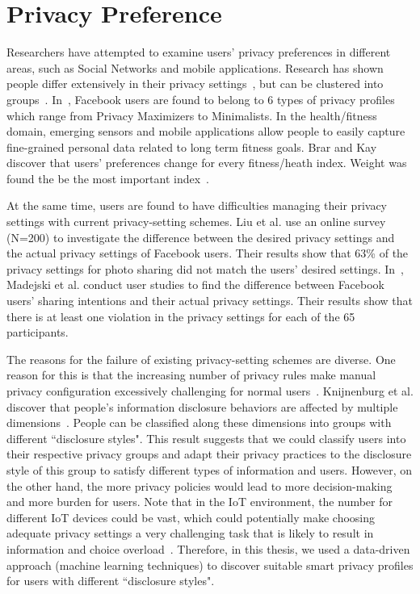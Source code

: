 \section{Privacy Preference}
Researchers have attempted to examine users' privacy preferences in different areas, such as Social Networks and mobile applications. Research has shown people differ extensively in their privacy settings~\cite{olson2005study}, but can be clustered into groups~\cite{anthony2007privacy,knijnenburg2013dimensionality}. In~\cite{wisniewski2014profiling, knijnenburg2017privacy}, Facebook users are found to belong to 6 types of privacy profiles which range from Privacy Maximizers to Minimalists. In the health/fitness domain, emerging sensors and mobile applications allow people to easily capture fine-grained personal data related to long term fitness goals. Brar and Kay discover that users' preferences change for every fitness/heath index. Weight was found the be the most important index~\cite{brar2004privacy}. 

At the same time, users are found to have difficulties managing their privacy settings with current privacy-setting schemes. Liu et al. use an online survey (N=200) to investigate the difference between the desired privacy settings and the actual privacy settings of Facebook users. Their results show that 63\% of the privacy settings for photo sharing did not match the users' desired settings. In~\cite{madejski2012study}, Madejski et al. conduct user studies to find the difference between Facebook users’ sharing intentions and their actual privacy settings. Their results show that there is at least one violation in the privacy settings for each of the 65 participants.

The reasons for the failure of existing privacy-setting schemes are diverse. One reason for this is that the increasing number of privacy rules make manual privacy configuration excessively challenging for normal users~\cite{furnell2015managing}. Knijnenburg et al. discover that people's information disclosure behaviors
are affected by multiple dimensions~\cite{knijnenburg2013dimensionality}. People can be classified along these dimensions into groups with different ``disclosure styles". This result suggests that we could classify users into their respective privacy groups and adapt their privacy practices to the disclosure style of this group to satisfy different types of information and users. However, on the other hand, the more privacy policies would lead to more decision-making and more burden for users. Note that in the IoT environment, the number for different IoT devices could be vast, which could potentially make choosing adequate privacy settings a very challenging task that is likely to result in information and choice overload~\cite{williams2016perfect}. Therefore, in this thesis, we used a data-driven approach (machine learning techniques) to discover suitable smart privacy profiles for users with different ``disclosure styles".

